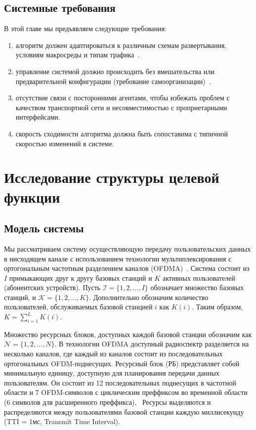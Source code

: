 \subsection{Системные требования}
В этой главе мы предъявляем следующие требования:
\begin{enumerate}
\item алгоритм должен адаптироваться к различным схемам развертывания, условиям макросреды и типам трафика~\cite{TS36.300}.
\item управление системой должно происходить без вмешательства или предварительной конфигурации (требование самоорганизации)~\cite{TS36.902}.
\item отсутствие связи с посторонними агентами, чтобы избежать проблем с качеством транспортной сети и несовместимостью с проприетарными интерфейсами.
\item скорость сходимости алгоритма должна быть сопоставима с типичной скоростью изменений в системе.
\end{enumerate}

\section{Исследование структуры целевой функции}

\subsection{Модель системы}
Мы рассматриваем систему осуществляющую передачу пользовательских данных в нисходящем канале с использованием технологии мультиплексирования с ортогональным частотным разделением каналов (OFDMA)~\cite{4534773}. Система состоит из $I$ примыкающих друг к другу базовых станций и $K$ активных пользователей (абонентских устройств). Пусть $\mathcal{I} = \{1, 2, ..., I\}$ обозначает множество базовых станций, и $\mathcal{K} = \{1, 2, ..., K\}$. Дополнительно обозначим количество пользователей, обслуживаемых базовой станцией $i$ как $K(i)$. Таким образом, $K = \sum_{i=1}^L{K(i)}$.

Множество ресурсных блоков, доступных каждой базовой станции обозначим как $\mathcal{N} = \{1,2,...,N\}$. В технологии OFDMA доступный радиоспектр разделяется на несколько каналов, где каждый из каналов состоит из последовательных ортогональных OFDM-поднесущих. Ресурсный блок (РБ) представляет собой минимальную единицу, доступную для планирования передачи данных пользователям. Он состоит из 12 последовательных поднесущих в частотной области и 7 OFDM-символов с циклическим преффиксом во временной области (6 символов для расширенного преффикса).~\cite{tichv} Ресурсы выделяются и распределяются между пользователями базовой станции каждую миллисекунду (TTI = 1мс, Transmit Time Interval).

